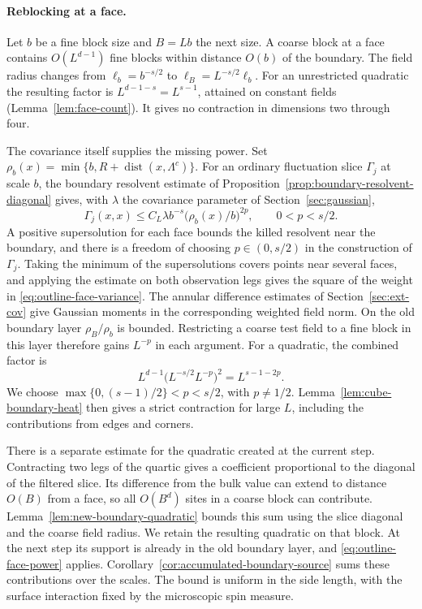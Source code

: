 \documentclass[11pt]{article}
\theoremstyle{definition}
\newcommand{\dist}{\operatorname{dist}}
\begin{document}
\paragraph{Reblocking at a face.}
Let \(b\) be a fine block size and \(B=Lb\) the next size.
A coarse block at a face contains \(O(L^{d-1})\) fine blocks within
distance \(O(b)\) of the boundary. The field radius changes from
\(\ell_b=b^{-s/2}\) to \(\ell_B=L^{-s/2}\ell_b\). For an unrestricted
quadratic the resulting factor is \(L^{d-1-s}=L^{s-1}\), attained
on constant fields (Lemma~\ref{lem:face-count}). It gives no
contraction in dimensions two through four.

The covariance itself supplies the missing power. Set
\(\rho_b(x)=\min\{b,R+\dist(x,\Lambda^c)\}\). For an ordinary
fluctuation slice \(\Gamma_j\) at scale \(b\), the boundary resolvent
estimate of Proposition~\ref{prop:boundary-resolvent-diagonal} gives,
with \(\lambda\) the covariance parameter of Section~\ref{sec:gaussian},
\begin{equation}
 \Gamma_j(x,x)\le C_L\lambda b^{-s}
                  \bigl(\rho_b(x)/b\bigr)^{2p},
 \qquad 0<p<s/2 .
 \label{eq:outline-face-variance}
\end{equation}
A positive supersolution for each face bounds the killed resolvent near the boundary,
and there is a freedom of choosing $p \in (0,s/2)$ in the construction of $\Gamma_j$.
Taking the minimum of the supersolutions covers points near several
faces, and applying the estimate on both observation legs gives the
square of the weight in \eqref{eq:outline-face-variance}. The annular
difference estimates of Section~\ref{sec:ext-cov} give Gaussian moments
in the corresponding weighted field norm. On the old boundary layer
\(\rho_B/\rho_b\) is bounded. Restricting a coarse test field to a
fine block in this layer therefore gains \(L^{-p}\) in each argument.
For a quadratic, the combined factor is
\begin{equation}
 L^{d-1}\bigl(L^{-s/2}L^{-p}\bigr)^2=L^{s-1-2p}.
 \label{eq:outline-face-power}
\end{equation}
We choose \(\max\{0,(s-1)/2\}<p<s/2\), with \(p\ne1/2\).
Lemma~\ref{lem:cube-boundary-heat} then gives a strict contraction
for large \(L\), including the contributions from edges and corners.

There is a separate estimate for the quadratic created at the
current step. Contracting two legs of the quartic gives a coefficient
proportional to the diagonal of the filtered slice. Its difference
from the bulk value can extend to distance \(O(B)\) from a face,
so all \(O(B^d)\) sites in a coarse block can contribute.
Lemma~\ref{lem:new-boundary-quadratic} bounds this sum using the
slice diagonal and the coarse field radius. We retain the resulting
quadratic on that block. At the next step its support is already
in the old boundary layer, and \eqref{eq:outline-face-power} applies.
Corollary~\ref{cor:accumulated-boundary-source} sums these contributions
over the scales. The bound is uniform in the side length, with the surface
interaction fixed by the microscopic spin measure.
\end{document}
